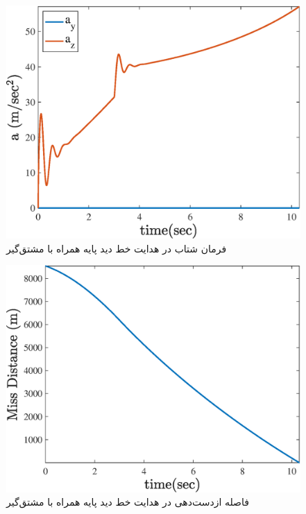 \begin{figure}[H]
	\centering
	\includegraphics[width=.75\linewidth]{../Figure/d/command}
	\caption{فرمان شتاب در هدایت خط دید پایه همراه با مشتق‌گیر}
\end{figure}

\begin{figure}[H]
	\centering
	\includegraphics[width=.75\linewidth]{../Figure/d/miss_distance}
	\caption{فاصله ازدست‌دهی در هدایت خط دید پایه همراه با مشتق‌گیر}
\end{figure}


